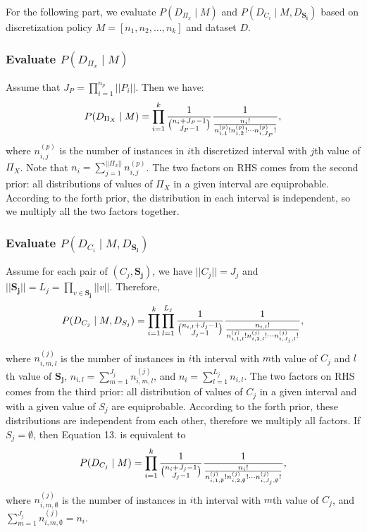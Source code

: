 For the following part, we evaluate $P(D_{\Pi_x} \mid M)$  and $P(D_{C_i} \mid M, D_{\boldsymbol{S_i}})$ based on discretization policy $M = [n_1,n_2,\ldots,n_k]$ and dataset $D$.
\subsubsection{Evaluate $P(D_{\Pi_x} \mid M)$}
Assume that $J_P = \prod_{i=1}^{n_p} || P_i ||$. Then we have:
\begin{equation}
P(D_{\Pi_X} \mid M) = \prod_{i=1}^k  {{1}\over{{n_i + J_P - 1}\choose{J_P -1}}}
{{1}\over{ {{{n}_i}!}\over{ {n^{(p)}_{i,1} !} {n^{(p)}_{i,2} !} \cdots {n^{(p)}_{i,J_P} !}}  }},
\end{equation}
where $n^{(p)}_{i,j}$ is the number of instances in $i$th discretized interval with $j$th value of $\Pi_X$. Note that $n_i = \sum_{j=1}^{|| \Pi_x ||} n^{(p)}_{i,j}$. The two factors on RHS comes from the second prior: all distributions of values of $\Pi_X$ in a given interval are equiprobable. According to the forth prior, the distribution in each interval is independent, so we multiply all the two factors together.
\subsubsection{Evaluate $P(D_{C_i} \mid M, D_{\boldsymbol{S_i}})$}
Assume for each pair of $(C_j, \boldsymbol{S_j})$, we have $||C_j || = J_j$ and $|| \boldsymbol{S_j} || = L_j = \prod_{v \in \boldsymbol{S_j}} || v ||$. Therefore,
\begin{equation}
P(D_{C_j}  \mid M, D_{S_j}) =
\prod_{i=1}^{k} \prod_{l=1}^{L_j} {{1}\over{{n_{i,l} + J_j - 1}\choose{J_j-1}}}
{{1}\over{ {{n_{i,l}}!}\over{ {n^{(j)}_{i,1,l} !} {n^{(j)}_{i,2,l} !} \cdots {n^{(j)}_{i,J_j,l} !}}  }},
\end{equation}
where $n^{(j)}_{i,m,l}$ is the number of instances in $i$th interval with $m$th value of $C_j$ and $l$th value of $\boldsymbol{S_j}$, $n_{i,l} = \sum_{m=1}^{J_j} n^{(j)}_{i,m,l}$, and $n_i = \sum_{l=1}^{L_j} n_{i,l}$. The two factors on RHS comes from the third prior: all distribution of values of $C_j$ in a given interval and with a given value of $S_j$ are equiprobable. According to the forth prior, these distributions are independent from each other, therefore we multiply all factors. If $S_j = \emptyset$, then Equation 13. is equivalent to
\begin{equation}
P(D_{C_j}  \mid M) =
\prod_{i=1}^{k}  {{1}\over{{n_{i} + J_j - 1}\choose{J_j-1}}}
{{1}\over{ {{n_{i}}!}\over{ {n^{(j)}_{i,1,\emptyset} !} {n^{(j)}_{i,2,\emptyset} !} \cdots {n^{(j)}_{i,J_j,\emptyset} !}}  }},
\end{equation}
where $n^{(j)}_{i,m,\emptyset}$ is the number of instances in $i$th interval with $m$th value of $C_j$, and $\sum_{m=1}^{J_j} n^{(j)}_{i,m,\emptyset} = n_i$. \\

